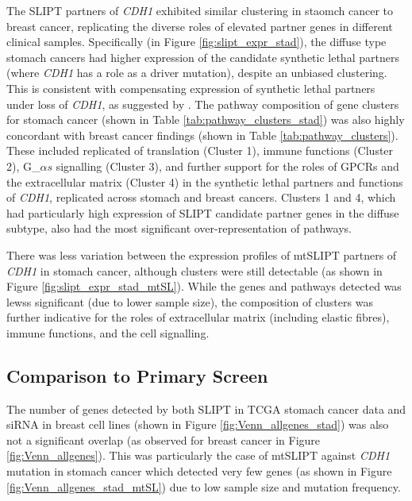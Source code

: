The SLIPT partners of \textit{CDH1} exhibited similar clustering in staomch cancer to breast cancer, replicating the diverse roles of elevated partner genes in different clinical samples. Specifically (in Figure \ref{fig:slipt_expr_stad}), the diffuse type stomach cancers had higher expression of the candidate synthetic lethal partners (where \textit{CDH1} has a role as a driver mutation), despite an unbiased clustering. This is consistent with compensating expression of synthetic lethal partners under loss of \textit{CDH1}, as suggested by \citet{Lu2015}. The pathway composition of gene clusters for stomach cancer (shown in Table \ref{tab:pathway_clusters_stad}) was also highly concordant with breast cancer findings (shown in Table \ref{tab:pathway_clusters}). These included replicated of translation (Cluster 1), immune functions (Cluster 2), G_${\alpha s}$ signalling (Cluster 3), and further support for the roles of GPCRs and the extracellular matrix (Cluster 4) in the synthetic lethal partners and functions of \textit{CDH1}, replicated across stomach and breast cancers. Clusters 1 and 4, which had particularly high expression of SLIPT candidate partner genes in the diffuse subtype, also had the most significant over-representation of pathways.

There was less variation between the expression profiles of mtSLIPT partners of \textit{CDH1} in stomach cancer, although clusters were still detectable (as shown in Figure \ref{fig:slipt_expr_stad_mtSL}). While the genes and pathways detected was lewss significant (due to lower sample size), the composition of clusters was further indicative for the roles of extracellular matrix (including elastic fibres), immune functions, and the cell signalling.

\FloatBarrier

\subsection{Comparison to Primary Screen} \label{chapt3:compare_SL_genes_stad}

The number of genes detected by both SLIPT in TCGA stomach cancer data and siRNA in breast cell lines (shown in Figure \ref{fig:Venn_allgenes_stad}) was also not a significant overlap (as observed for breast cancer in Figure \ref{fig:Venn_allgenes}). This was particularly the case of mtSLIPT against \textit{CDH1} mutation in stomach cancer which detected very few genes (as shown in Figure \ref{fig:Venn_allgenes_stad_mtSL}) due to low sample size and mutation frequency.

